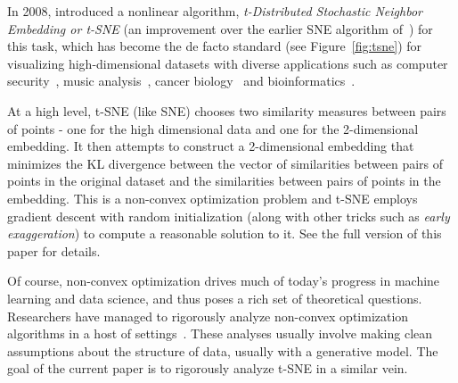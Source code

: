 In 2008, \citet{van2008tsne} introduced a nonlinear algorithm, {\em t-Distributed Stochastic Neighbor Embedding or t-SNE} (an improvement over the earlier SNE algorithm of~\citet{DBLP:conf/nips/HintonR02}) for this task, which has become the de facto standard (see Figure~\ref{fig:tsne}) for visualizing high-dimensional datasets with diverse applications such as computer security~\citep{DBLP:conf/nca/GashiSLT09}, music analysis~\citep{conf/ismir/HamelE10}, cancer biology~\citep{Abdelmoula12244} and bioinformatics~\citep{WallachLilien2009}. %

At a high level, t-SNE (like SNE) chooses two similarity measures between pairs of points - one for the high dimensional data and one for the 2-dimensional embedding. It then attempts to construct a 2-dimensional embedding that minimizes the KL divergence between
the vector of similarities between pairs of points in the original dataset
and the similarities between pairs of points in the embedding. This is a non-convex optimization problem and t-SNE employs gradient descent with random initialization (along with other tricks such as \emph{early exaggeration}) to compute a reasonable solution to it. See the full version of this paper for details. 

Of course, non-convex optimization drives much of today's progress in machine learning and data science, and thus poses a rich set of theoretical questions. Researchers have managed to rigorously analyze non-convex optimization algorithms in a host of settings~\citep{DBLP:conf/focs/Dasgupta99,MR3185945-Arora12,DBLP:conf/colt/AroraGM14,DBLP:conf/nips/BhojanapalliNS16,DBLP:conf/colt/GeHJY15,DBLP:journals/tit/SunQW17,DBLP:conf/icml/0001JZ17,DBLP:journals/corr/GeLM16,DBLP:conf/aistats/ParkKCS17}. These analyses usually involve making clean assumptions about the structure of data, usually with a generative model. The goal of the current paper is to rigorously analyze t-SNE in a similar vein. 

